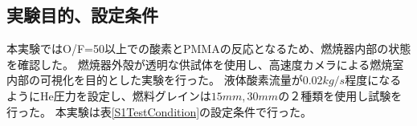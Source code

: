 \subsection{実験目的、設定条件}
本実験ではO/F=50以上での酸素とPMMAの反応となるため、燃焼器内部の状態を確認した。
燃焼器外殻が透明な供試体を使用し、高速度カメラによる燃焼室内部の可視化を目的とした実験を行った。
液体酸素流量が$0.02kg/s$程度になるようにHe圧力を設定し、燃料グレインは$15mm,30mm$の２種類を使用し試験を行った。
本実験は表\ref{S1TestCondition}の設定条件で行った。
